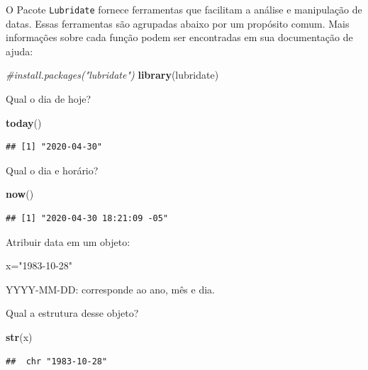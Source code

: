 \documentclass[
]{book}
\newenvironment{Shaded}{\begin{snugshade}}{\end{snugshade}}
\newcommand{\CommentTok}[1]{\textcolor[rgb]{0.56,0.35,0.01}{\textit{#1}}}
\newcommand{\KeywordTok}[1]{\textcolor[rgb]{0.13,0.29,0.53}{\textbf{#1}}}
\newcommand{\NormalTok}[1]{#1}
\newcommand{\StringTok}[1]{\textcolor[rgb]{0.31,0.60,0.02}{#1}}
\begin{document}
O Pacote \texttt{Lubridate} fornece ferramentas que facilitam a análise e manipulação de datas. Essas ferramentas são agrupadas abaixo por um propósito comum. Mais informações sobre cada função podem ser encontradas em sua documentação de ajuda:

\begin{Shaded}
\begin{Highlighting}[]
\CommentTok{#install.packages("lubridate")}
\KeywordTok{library}\NormalTok{(lubridate)}
\end{Highlighting}
\end{Shaded}

Qual o dia de hoje?

\begin{Shaded}
\begin{Highlighting}[]
\KeywordTok{today}\NormalTok{()}
\end{Highlighting}
\end{Shaded}

\begin{verbatim}
## [1] "2020-04-30"
\end{verbatim}

Qual o dia e horário?

\begin{Shaded}
\begin{Highlighting}[]
\KeywordTok{now}\NormalTok{()}
\end{Highlighting}
\end{Shaded}

\begin{verbatim}
## [1] "2020-04-30 18:21:09 -05"
\end{verbatim}

Atribuir data em um objeto:

\begin{Shaded}
\begin{Highlighting}[]
\NormalTok{x=}\StringTok{"1983-10-28"}
\end{Highlighting}
\end{Shaded}

YYYY-MM-DD: corresponde ao ano, mês e dia.

Qual a estrutura desse objeto?

\begin{Shaded}
\begin{Highlighting}[]
\KeywordTok{str}\NormalTok{(x)}
\end{Highlighting}
\end{Shaded}

\begin{verbatim}
##  chr "1983-10-28"
\end{verbatim}
\end{document}
